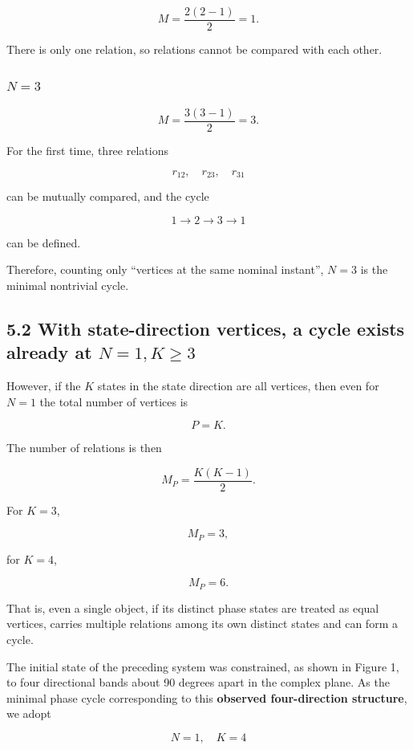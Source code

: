 \documentclass[
  a4paper,
]{article}
\begin{document}
\[
M
=
\frac{2(2-1)}{2}
=1.
\]

There is only one relation, so relations cannot be compared with each
other.

\subsubsection{\texorpdfstring{\(N=3\)}{N=3}}\label{n3}

\[
M
=
\frac{3(3-1)}{2}
=3.
\]

For the first time, three relations

\[
r_{12},\quad r_{23},\quad r_{31}
\]

can be mutually compared, and the cycle

\[
1\to2\to3\to1
\]

can be defined.

Therefore, counting only ``vertices at the same nominal instant'',
\(N=3\) is the minimal nontrivial cycle.

\subsection{\texorpdfstring{5.2 With state-direction vertices, a cycle
exists already at
\(N=1, K\ge3\)}{5.2 With state-direction vertices, a cycle exists already at N=1, K\textbackslash ge3}}\label{with-state-direction-vertices-a-cycle-exists-already-at-n1-kge3}

However, if the \(K\) states in the state direction are all vertices,
then even for \(N=1\) the total number of vertices is

\[
P=K.
\]

The number of relations is then

\[
M_P
=
\frac{K(K-1)}{2}.
\]

For \(K=3\),

\[
M_P
=
3,
\]

for \(K=4\),

\[
M_P
=
6.
\]

That is, even a single object, if its distinct phase states are treated
as equal vertices, carries multiple relations among its own distinct
states and can form a cycle.

The initial state of the preceding system was constrained, as shown in
Figure 1, to four directional bands about 90 degrees apart in the
complex plane. As the minimal phase cycle corresponding to this
\textbf{observed four-direction structure}, we adopt

\[
\boxed{N=1,\quad K=4}
\]
\end{document}

